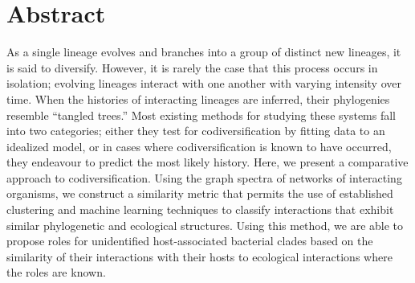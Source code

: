 \section{Abstract}

As a single lineage evolves and branches into a group of distinct new
lineages, it is said to diversify. However, it is rarely the case that
this process occurs in isolation; evolving lineages interact with one
another with varying intensity over time. When the histories of
interacting lineages are inferred, their phylogenies resemble ``tangled
trees.'' Most existing methods for studying these systems fall into two
categories; either they test for codiversification by fitting data to
an idealized model, or in cases where codiversification is known to
have occurred, they endeavour to predict the most likely history.
Here, we present a comparative approach to codiversification. Using
the graph spectra of networks of interacting organisms, we construct a
similarity metric that permits the use of established clustering and
machine learning techniques to classify interactions that exhibit
similar phylogenetic and ecological structures. Using this method, we
are able to propose roles for unidentified host-associated bacterial
clades based on the similarity of their interactions with their hosts
to ecological interactions where the roles are known.
